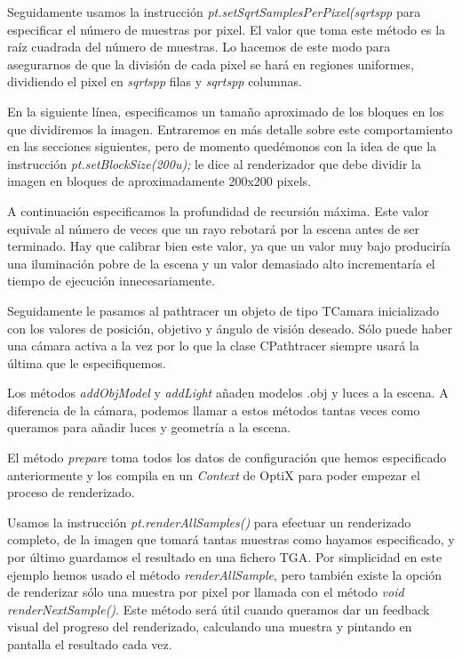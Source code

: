 \medskip

Seguidamente usamos la instrucción \emph{pt.setSqrtSamplesPerPixel(sqrtspp} para especificar el número de muestras por pixel. El valor que toma este método es la raíz cuadrada del número de muestras. Lo hacemos de este modo para asegurarnos de que la división de cada pixel se hará en regiones uniformes, dividiendo el pixel en \emph{sqrtspp} filas y \emph{sqrtspp} columnas.

\medskip

En la siguiente línea, especificamos un tamaño aproximado de los bloques en los que dividiremos la imagen. Entraremos en más detalle sobre este comportamiento en las secciones siguientes, pero de momento quedémonos con la idea de que la instrucción \emph{pt.setBlockSize(200u);} le dice al renderizador que debe dividir la imagen en bloques de aproximadamente 200x200 pixels. 

\medskip

A continuación especificamos la profundidad de recursión máxima. Este valor equivale al número de veces que un rayo rebotará por la escena antes de ser terminado. Hay que calibrar bien este valor, ya que un valor muy bajo produciría una iluminación pobre de la escena y un valor demasiado alto incrementaría el tiempo de ejecución innecesariamente.

\medskip

Seguidamente le pasamos al pathtracer un objeto de tipo TCamara inicializado con los valores de posición, objetivo y ángulo de visión deseado. Sólo puede haber una cámara activa a la vez por lo que la clase CPathtracer siempre usará la última que le especifiquemos.

\medskip

Los métodos \emph{addObjModel} y \emph{addLight} añaden modelos .obj y luces a la escena. A diferencia de la cámara, podemos llamar a estos métodos tantas veces como queramos para añadir luces y geometría a la escena.

\medskip

El método \emph{prepare} toma todos los datos de configuración que hemos especificado anteriormente y los compila en un \emph{Context} de OptiX para poder empezar el proceso de renderizado.

\medskip

Usamos la instrucción \emph{pt.renderAllSamples()} para efectuar un renderizado completo, de la imagen que tomará tantas muestras como hayamos especificado, y por último guardamos el resultado en una fichero TGA. Por simplicidad en este ejemplo hemos usado el método \emph{renderAllSample}, pero también existe la opción de renderizar sólo una muestra por pixel por llamada con el método \emph{void renderNextSample()}. Este método será útil cuando queramos dar un feedback visual del progreso del renderizado, calculando una muestra y pintando en pantalla el resultado cada vez.

